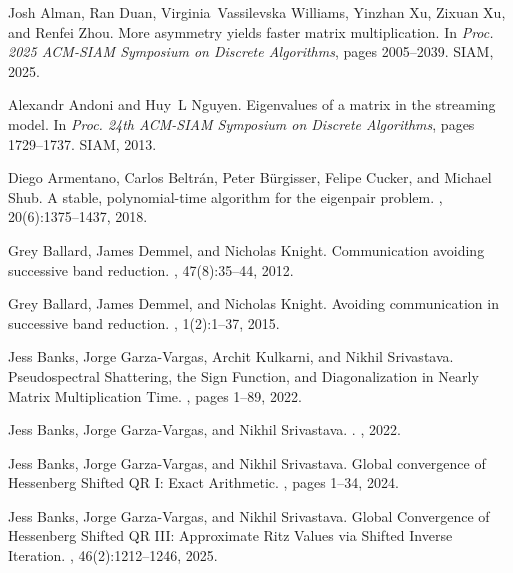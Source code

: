 \documentclass{article}
\begin{document}

\begin{thebibliography}{10}

Josh Alman, Ran Duan, Virginia~Vassilevska Williams, Yinzhan Xu, Zixuan Xu, and Renfei Zhou.
\newblock More asymmetry yields faster matrix multiplication.
\newblock In {\em Proc. 2025 ACM-SIAM Symposium on Discrete Algorithms}, pages 2005--2039. SIAM, 2025.

Alexandr Andoni and Huy~L Nguyen.
\newblock Eigenvalues of a matrix in the streaming model.
\newblock In {\em Proc. 24th ACM-SIAM Symposium on Discrete Algorithms}, pages 1729--1737. SIAM, 2013.

Diego Armentano, Carlos Beltr{\'a}n, Peter B{\"u}rgisser, Felipe Cucker, and Michael Shub.
\newblock A stable, polynomial-time algorithm for the eigenpair problem.
, 20(6):1375--1437, 2018.

Grey Ballard, James Demmel, and Nicholas Knight.
\newblock Communication avoiding successive band reduction.
, 47(8):35--44, 2012.

Grey Ballard, James Demmel, and Nicholas Knight.
\newblock Avoiding communication in successive band reduction.
, 1(2):1--37, 2015.

Jess Banks, Jorge Garza-Vargas, Archit Kulkarni, and Nikhil Srivastava.
\newblock Pseudospectral {S}hattering, the {S}ign {F}unction, and {D}iagonalization in {N}early {M}atrix {M}ultiplication {T}ime.
, pages 1--89, 2022.

Jess Banks, Jorge Garza-Vargas, and Nikhil Srivastava.
.
, 2022.

Jess Banks, Jorge Garza-Vargas, and Nikhil Srivastava.
\newblock Global convergence of {H}essenberg {S}hifted {QR I: E}xact {A}rithmetic.
, pages 1--34, 2024.

Jess Banks, Jorge Garza-Vargas, and Nikhil Srivastava.
\newblock Global {Convergence of Hessenberg Shifted QR III: Approximate Ritz Values via Shifted Inverse I}teration.
, 46(2):1212--1246, 2025.


\end{thebibliography}
\end{document}
